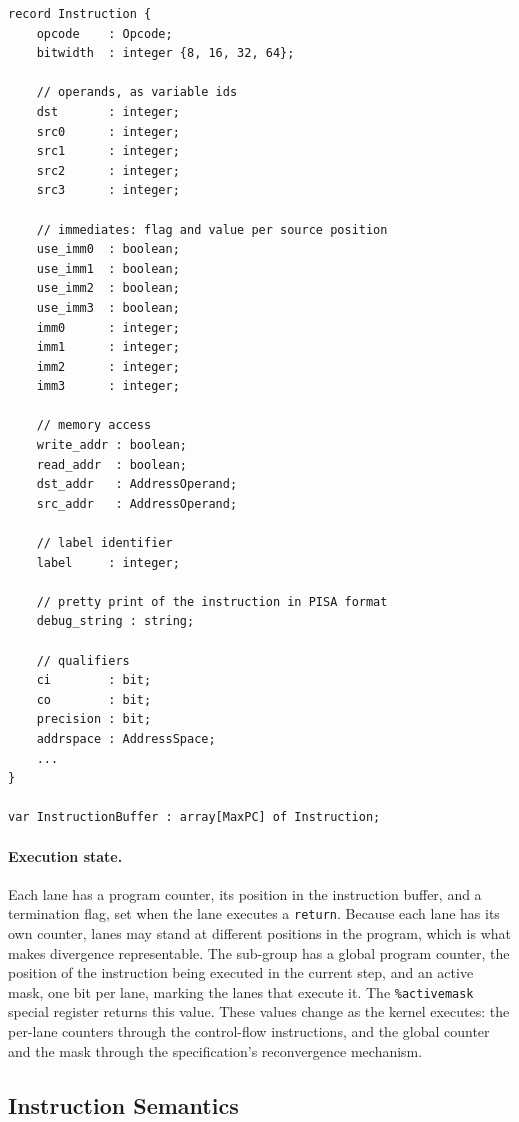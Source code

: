 \begin{lstlisting}[caption={The instruction record (excerpt). An instruction buffer entry carries every field any instruction of the subset may need. The fields not used by an instruction are left unset.}, label={lst:instruction-record}]
record Instruction {
    opcode    : Opcode;
    bitwidth  : integer {8, 16, 32, 64};

    // operands, as variable ids
    dst       : integer;
    src0      : integer;
    src1      : integer;
    src2      : integer;
    src3      : integer;

    // immediates: flag and value per source position
    use_imm0  : boolean;
    use_imm1  : boolean;
    use_imm2  : boolean;
    use_imm3  : boolean;
    imm0      : integer;
    imm1      : integer;
    imm2      : integer;
    imm3      : integer;

    // memory access
    write_addr : boolean;
    read_addr  : boolean;
    dst_addr   : AddressOperand;
    src_addr   : AddressOperand;

    // label identifier
    label     : integer;

    // pretty print of the instruction in PISA format
    debug_string : string;

    // qualifiers
    ci        : bit;
    co        : bit;
    precision : bit;
    addrspace : AddressSpace;
    ...
}

var InstructionBuffer : array[MaxPC] of Instruction;
\end{lstlisting}

\paragraph{Execution state.} Each lane has a program counter, its
position in the instruction buffer, and a termination flag, set when the
lane executes a \texttt{return}. Because each lane has its own counter,
lanes may stand at different positions in the program, which is what
makes divergence representable. The sub-group has a global program
counter, the position of the instruction being executed in the current
step, and an active mask, one bit per lane, marking the lanes that execute
it. The \texttt{\%activemask} special
register returns this value. These values change as the kernel executes: the per-lane counters through
the control-flow instructions, and the global counter and the mask through
the specification's reconvergence mechanism.

\subsection{Instruction Semantics}
\label{sec:asl-instructions}

